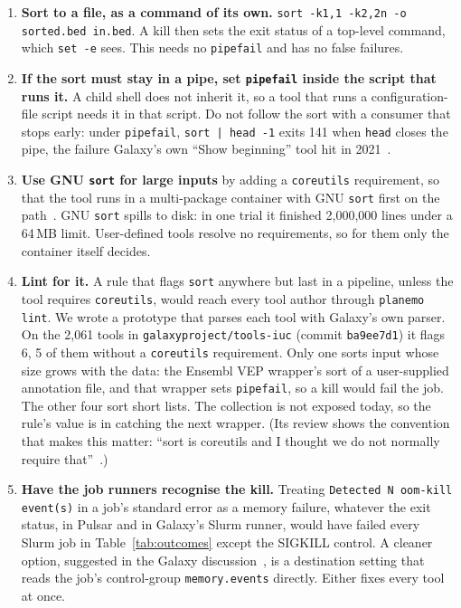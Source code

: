 \documentclass[11pt,letterpaper]{article}
\newcommand{\code}[1]{\texttt{#1}}
\begin{document}
\begin{enumerate}
\item \textbf{Sort to a file, as a command of its own.} \code{sort -k1,1 -k2,2n -o sorted.bed in.bed}. A kill then
sets the exit status of a top-level command, which \code{set -e} sees. This needs no \code{pipefail} and has no false
failures.
\item \textbf{If the sort must stay in a pipe, set \code{pipefail} inside the script that runs it.} A child shell
does not inherit it, so a tool that runs a configuration-file script needs it in that script. Do not follow the sort
with a consumer that stops early: under \code{pipefail}, \code{sort | head -1} exits 141 when \code{head} closes
the pipe, the failure Galaxy's own ``Show beginning'' tool hit in 2021~\cite{galaxy12093}.
\item \textbf{Use GNU \code{sort} for large inputs} by adding a \code{coreutils} requirement, so that the tool runs in
a multi-package container with GNU \code{sort} first on the path~\cite{iuc3920}. GNU \code{sort} spills to disk:
in one trial it finished 2{,}000{,}000 lines under a 64\,MB limit. User-defined tools resolve no requirements, so
for them only the container itself decides.
\item \textbf{Lint for it.} A rule that flags \code{sort} anywhere but last in a pipeline, unless the tool requires
\code{coreutils}, would reach every tool author through \code{planemo lint}. We wrote a prototype that parses each
tool with Galaxy's own parser. On the 2{,}061 tools in \code{galaxyproject/tools-iuc} (commit \code{ba9ee7d1}) it
flags 6, 5 of them without a \code{coreutils} requirement. Only one sorts input whose size grows with the data: the
Ensembl VEP wrapper's sort of a user-supplied annotation file, and that wrapper sets \code{pipefail}, so a kill
would fail the job. The other four sort short lists. The collection is not exposed today, so the rule's value is in
catching the next wrapper. (Its review shows the convention that makes this matter: ``sort is coreutils and I
thought we do not normally require that''~\cite{iuc4533}.)
\item \textbf{Have the job runners recognise the kill.} Treating \code{Detected N oom-kill event(s)} in a job's
standard error as a memory failure, whatever the exit status, in Pulsar and in Galaxy's Slurm runner, would have
failed every Slurm job in Table~\ref{tab:outcomes} except the SIGKILL control. A cleaner option, suggested in the
Galaxy discussion~\cite{galaxy24545}, is a destination setting that reads the job's control-group
\code{memory.events} directly. Either fixes every tool at once.
\end{enumerate}
\end{document}
